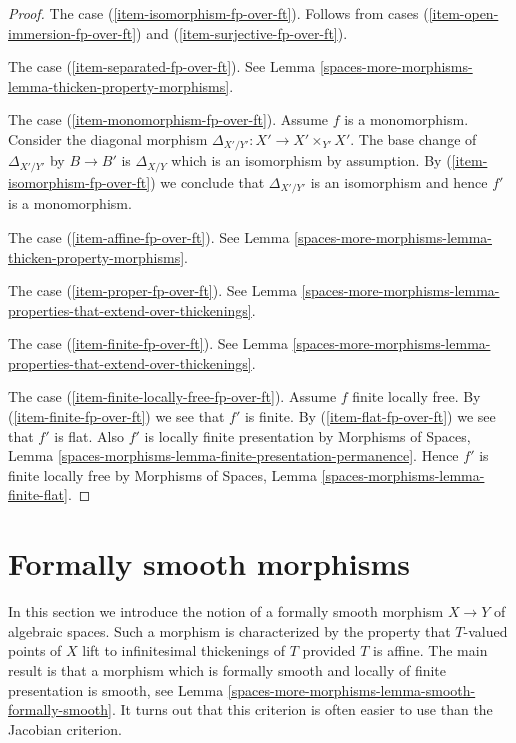 \begin{proof}
\medskip\noindent
The case (\ref{item-isomorphism-fp-over-ft}). Follows from cases
(\ref{item-open-immersion-fp-over-ft}) and (\ref{item-surjective-fp-over-ft}).

\medskip\noindent
The case (\ref{item-separated-fp-over-ft}). See
Lemma \ref{spaces-more-morphisms-lemma-thicken-property-morphisms}.

\medskip\noindent
The case (\ref{item-monomorphism-fp-over-ft}). Assume $f$ is a monomorphism.
Consider the diagonal morphism $\Delta_{X'/Y'} : X' \to X' \times_{Y'} X'$.
The base change of $\Delta_{X'/Y'}$ by $B \to B'$ is $\Delta_{X/Y}$
which is an isomorphism by assumption. By (\ref{item-isomorphism-fp-over-ft})
we conclude that $\Delta_{X'/Y'}$ is an isomorphism and hence
$f'$ is a monomorphism.

\medskip\noindent
The case (\ref{item-affine-fp-over-ft}).
See Lemma \ref{spaces-more-morphisms-lemma-thicken-property-morphisms}.

\medskip\noindent
The case (\ref{item-proper-fp-over-ft}). See
Lemma \ref{spaces-more-morphisms-lemma-properties-that-extend-over-thickenings}.

\medskip\noindent
The case (\ref{item-finite-fp-over-ft}). See
Lemma \ref{spaces-more-morphisms-lemma-properties-that-extend-over-thickenings}.

\medskip\noindent
The case (\ref{item-finite-locally-free-fp-over-ft}).
Assume $f$ finite locally free.
By (\ref{item-finite-fp-over-ft}) we see that $f'$ is finite.
By (\ref{item-flat-fp-over-ft}) we see that $f'$ is flat.
Also $f'$ is locally finite presentation by
Morphisms of Spaces, Lemma
\ref{spaces-morphisms-lemma-finite-presentation-permanence}.
Hence $f'$ is finite locally free by
Morphisms of Spaces, Lemma \ref{spaces-morphisms-lemma-finite-flat}.
\end{proof}

\section{Formally smooth morphisms}
\label{spaces-more-morphisms-section-formally-smooth}
In this section we introduce the notion of a formally smooth morphism
$X \to Y$ of algebraic spaces. Such a morphism is
characterized by the property that $T$-valued points of $X$ lift
to infinitesimal thickenings of $T$ provided $T$ is affine.
The main result is that a morphism which is formally smooth and
locally of finite presentation is smooth, see
Lemma \ref{spaces-more-morphisms-lemma-smooth-formally-smooth}.
It turns out that this criterion is often easier to use than the
Jacobian criterion.

